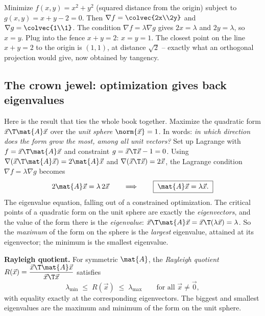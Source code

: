 \begin{example}
\label{ch36:ex-lagrange-line}
Minimize $f(x,y)=x^2+y^2$ (squared distance from the origin) subject to
$g(x,y)=x+y-2=0$. Then $\nabla f=\colvec{2x\\2y}$ and $\nabla g=\colvec{1\\1}$. The
condition $\nabla f=\lambda\nabla g$ gives $2x=\lambda$ and $2y=\lambda$, so $x=y$.
Plug into the fence $x+y=2$: $x=y=1$. The closest point on the line $x+y=2$ to the
origin is $(1,1)$, at distance $\sqrt2$ -- exactly what an orthogonal projection
would give, now obtained by tangency.
\end{example}

\subsection{The crown jewel: optimization gives back eigenvalues}

Here is the result that ties the whole book together. Maximize the quadratic form
$\vec{x}\T\mat{A}\vec{x}$ over the \emph{unit sphere} $\norm{\vec{x}}=1$. In words:
\emph{in which direction does the form grow the most, among all unit vectors?} Set up
Lagrange with $f=\vec{x}\T\mat{A}\vec{x}$ and constraint $g=\vec{x}\T\vec{x}-1=0$. Using
$\nabla(\vec{x}\T\mat{A}\vec{x})=2\mat{A}\vec{x}$ and $\nabla(\vec{x}\T\vec{x})=2\vec{x}$,
the Lagrange condition $\nabla f=\lambda\nabla g$ becomes
\[
  2\mat{A}\vec{x}=\lambda\,2\vec{x}
  \qquad\Longrightarrow\qquad \boxed{\;\mat{A}\vec{x}=\lambda\vec{x}.\;}
\]
The eigenvalue equation, falling out of a constrained optimization. The critical
points of a quadratic form on the unit sphere are exactly the \emph{eigenvectors}, and
the value of the form there is the \emph{eigenvalue}: $\vec{x}\T\mat{A}\vec{x}=
\vec{x}\T(\lambda\vec{x})=\lambda$. So the \emph{maximum} of the form on the sphere is
the \emph{largest} eigenvalue, attained at its eigenvector; the minimum is the
smallest eigenvalue.

\begin{formalbox}
\label{ch36:thm-rayleigh}
\textbf{Rayleigh quotient.} For symmetric $\mat{A}$, the \emph{Rayleigh quotient}
$R(\vec{x})=\dfrac{\vec{x}\T\mat{A}\vec{x}}{\vec{x}\T\vec{x}}$ satisfies
\[
  \lambda_{\min} \;\le\; R(\vec{x}) \;\le\; \lambda_{\max} \qquad\text{for all }\vec{x}\ne\vec0,
\]
with equality exactly at the corresponding eigenvectors. The biggest and smallest
eigenvalues are the maximum and minimum of the form on the unit sphere.
\end{formalbox}

